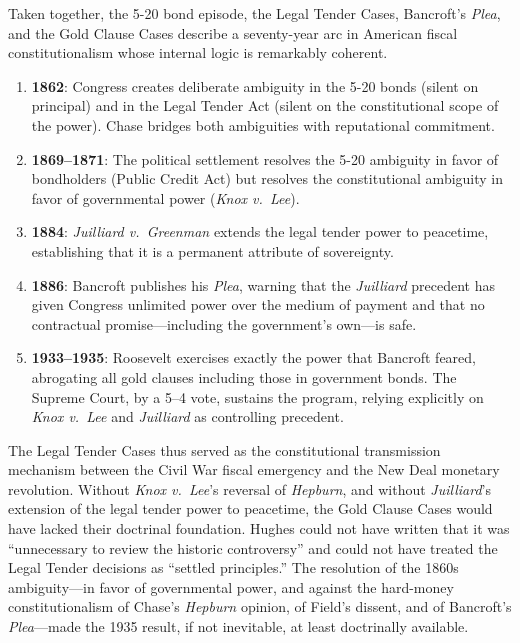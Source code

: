 \documentclass[12pt]{article}
\begin{document}
Taken together, the 5-20 bond episode, the Legal Tender Cases, Bancroft's
\textit{Plea}, and the Gold Clause Cases describe a seventy-year arc in
American fiscal constitutionalism whose internal logic is remarkably
coherent.

\begin{enumerate}

\item \textbf{1862}: Congress creates deliberate ambiguity in the 5-20
bonds (silent on principal) and in the Legal Tender Act (silent on the
constitutional scope of the power). Chase bridges both ambiguities with
reputational commitment.

\item \textbf{1869--1871}: The political settlement resolves the 5-20
ambiguity in favor of bondholders (Public Credit Act) but resolves the
constitutional ambiguity in favor of governmental power (\textit{Knox
v.\ Lee}).

\item \textbf{1884}: \textit{Juilliard v.\ Greenman} extends the legal
tender power to peacetime, establishing that it is a permanent
attribute of sovereignty.

\item \textbf{1886}: Bancroft publishes his \textit{Plea}, warning that
the \textit{Juilliard} precedent has given Congress unlimited power
over the medium of payment and that no contractual promise---including
the government's own---is safe.

\item \textbf{1933--1935}: Roosevelt exercises exactly the power that
Bancroft feared, abrogating all gold clauses including those in
government bonds. The Supreme Court, by a 5--4 vote, sustains the
program, relying explicitly on \textit{Knox v.\ Lee} and
\textit{Juilliard} as controlling precedent.

\end{enumerate}

The Legal Tender Cases thus served as the constitutional transmission
mechanism between the Civil War fiscal emergency and the New Deal
monetary revolution. Without \textit{Knox v.\ Lee}'s reversal of
\textit{Hepburn}, and without \textit{Juilliard}'s extension of the
legal tender power to peacetime, the Gold Clause Cases would have
lacked their doctrinal foundation. Hughes could not have written that
it was ``unnecessary to review the historic controversy'' and could not
have treated the Legal Tender decisions as ``settled principles.'' The
resolution of the 1860s ambiguity---in favor of governmental power, and
against the hard-money constitutionalism of Chase's \textit{Hepburn}
opinion, of Field's dissent, and of Bancroft's \textit{Plea}---made the
1935 result, if not inevitable, at least doctrinally available.
\end{document}
